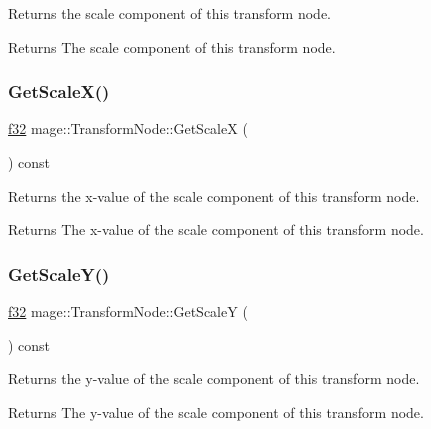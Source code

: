 Returns the scale component of this transform node.

\begin{DoxyReturn}{Returns}
The scale component of this transform node. 
\end{DoxyReturn}
\hypertarget{structmage_1_1_transform_node_a047c98891667092eb63ac58e115913bf}{}\label{structmage_1_1_transform_node_a047c98891667092eb63ac58e115913bf} 
\subsubsection{\texorpdfstring{Get\+Scale\+X()}{GetScaleX()}}
{\footnotesize\ttfamily \hyperlink{namespacemage_a6a44ad388483959dc4dff9f2aef91431}{f32} mage\+::\+Transform\+Node\+::\+Get\+ScaleX (\begin{DoxyParamCaption}{ }\end{DoxyParamCaption}) const\hspace{0.3cm}{\ttfamily [noexcept]}}

Returns the x-\/value of the scale component of this transform node.

\begin{DoxyReturn}{Returns}
The x-\/value of the scale component of this transform node. 
\end{DoxyReturn}
\hypertarget{structmage_1_1_transform_node_a049116cba80659ac2356b4793ef3d1bc}{}\label{structmage_1_1_transform_node_a049116cba80659ac2356b4793ef3d1bc} 
\subsubsection{\texorpdfstring{Get\+Scale\+Y()}{GetScaleY()}}
{\footnotesize\ttfamily \hyperlink{namespacemage_a6a44ad388483959dc4dff9f2aef91431}{f32} mage\+::\+Transform\+Node\+::\+Get\+ScaleY (\begin{DoxyParamCaption}{ }\end{DoxyParamCaption}) const\hspace{0.3cm}{\ttfamily [noexcept]}}

Returns the y-\/value of the scale component of this transform node.

\begin{DoxyReturn}{Returns}
The y-\/value of the scale component of this transform node. 
\end{DoxyReturn}
\hypertarget{structmage_1_1_transform_node_a7277c0e070bd7923a593c9756f023a60}{}\label{structmage_1_1_transform_node_a7277c0e070bd7923a593c9756f023a60} 
